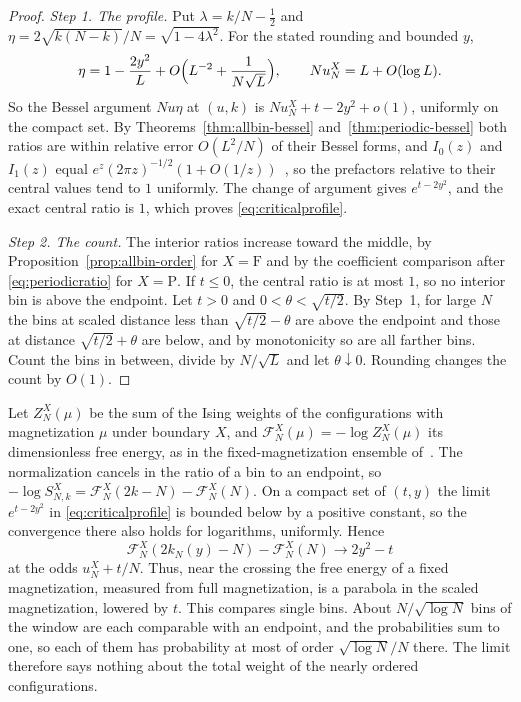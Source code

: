 \begin{proof}
\emph{Step 1. The profile.} Put $\lambda=k/N-\frac12$ and
$\eta=2\sqrt{k(N-k)}/N=\sqrt{1-4\lambda^2}$. For the stated rounding and
bounded $y$,
\[
\eta=1-\frac{2y^2}{L}+O\Bigl(L^{-2}+\frac1{N\sqrt L}\Bigr),
\qquad Nu_N^X=L+O(\log L).
\]
So the Bessel argument $Nu\eta$ at $(u,k)$ is $Nu_N^X+t-2y^2+o(1)$, uniformly
on the compact set. By Theorems~\ref{thm:allbin-bessel}
and~\ref{thm:periodic-bessel} both ratios are within relative error
$O(L^2/N)$ of their Bessel forms, and $I_0(z)$ and $I_1(z)$ equal
$e^z(2\pi z)^{-1/2}(1+O(1/z))$~\cite[Eq.~10.40.1]{dlmf}, so the prefactors
relative to their central values tend to $1$ uniformly. The change of argument
gives $e^{t-2y^2}$, and the exact central ratio is $1$, which proves
\eqref{eq:criticalprofile}.

\emph{Step 2. The count.} The interior ratios increase toward the middle, by
Proposition~\ref{prop:allbin-order} for $X=\mathrm F$ and by the coefficient
comparison after \eqref{eq:periodicratio} for $X=\mathrm P$. If
$t\le0$, the central ratio is at most $1$, so no interior bin is above the
endpoint. Let $t>0$ and $0<\theta<\sqrt{t/2}$. By Step~1, for large $N$ the
bins at scaled distance less than $\sqrt{t/2}-\theta$ are above the endpoint
and those at distance $\sqrt{t/2}+\theta$ are below, and by monotonicity so
are all farther bins. Count the bins in between, divide by $N/\sqrt L$ and let
$\theta\downarrow0$. Rounding changes the count by $O(1)$.
\end{proof}

\begin{remark}\label{rem:free-energy}
Let $Z^X_N(\mu)$ be the sum of the Ising weights of the configurations with
magnetization $\mu$ under boundary $X$, and $\mathcal F^X_N(\mu)=-\log Z^X_N(\mu)$ its
dimensionless free energy, as in the fixed-magnetization ensemble
of~\cite{dantchev2022,dantchev2024}. The normalization cancels in the
ratio of a bin to an endpoint, so $-\log S^X_{N,k}=\mathcal F^X_N(2k-N)-\mathcal F^X_N(N)$. On
a compact set of $(t,y)$ the limit $e^{t-2y^2}$ in
\eqref{eq:criticalprofile} is bounded below by a positive constant, so the
convergence there also holds for logarithms, uniformly. Hence
\[
\mathcal F^X_N(2k_N(y)-N)-\mathcal F^X_N(N)\longrightarrow2y^2-t
\]
at the odds $u_N^X+t/N$. Thus, near the crossing the free energy of a
fixed magnetization, measured from full magnetization, is a parabola in the
scaled magnetization, lowered by $t$. This compares single bins. About $N/\sqrt{\log N}$ bins of the window are
each comparable with an endpoint, and the probabilities sum to one, so each
of them has probability at most of order $\sqrt{\log N}/N$ there. The limit
therefore says nothing about the total weight of the nearly ordered
configurations.
\end{remark}

